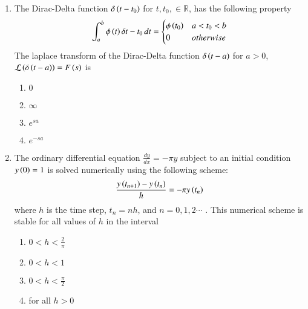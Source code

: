 \documentclass[journal,12pt,onecolumn]{IEEEtran}
\theoremstyle{remark}
\begin{document}
\begin{enumerate}
    \item The Dirac-Delta function $\delta\left(t -t_0\right)$ for $t, t_0, \in \mathbb{R}$, has the following
        property 
        \begin{align}
            \int_a^b \phi\left(t\right)\delta{t - t_0} \, dt = \begin{cases}
                \phi\left(t_0\right) & a < t_0 < b\\
                0 & otherwise
            \end{cases} 
        \end{align}
        The laplace transform of the Dirac-Delta function $\delta\left(t - a\right)$ for $a > 0$, 
        $\mathcal{L}\left(\delta\left(t - a\right)\right) = F\left(s\right)$ is 
        \hfill{}
        \begin{multicols}{4}
            \begin{enumerate}
                \item $0$
                    \columnbreak
                \item $\infty$
                    \columnbreak
                \item $e^{sa}$
                    \columnbreak
                \item $e^{-sa}$
            \end{enumerate}
        \end{multicols}
    \item The ordinary differential equation $\frac{dy}{dx} = -\pi y$ subject to an initial condition
        $y\left(0\right) = 1$ is solved numerically using the following scheme:
        \begin{align}
            \frac{y\left(t_{n+1}\right) - y\left(t_n\right)}{h} = -\pi y\left(t_n\right) 
        \end{align}
        where $h$ is the time step, $t_n = nh$, and $n = 0, 1, 2 \cdots$ . This numerical scheme
        is stable for all values of $h$ in the interval
        \hfill{}
        \begin{multicols}{4}
            \begin{enumerate}
                \item $0 < h < \frac{2}{\pi}$
                    \columnbreak
                \item $0 < h < 1$
                    \columnbreak
                \item $0 < h < \frac{\pi}{2}$
                    \columnbreak
                \item for all $h > 0$
            \end{enumerate}
        \end{multicols}


\end{enumerate}
\end{document}
